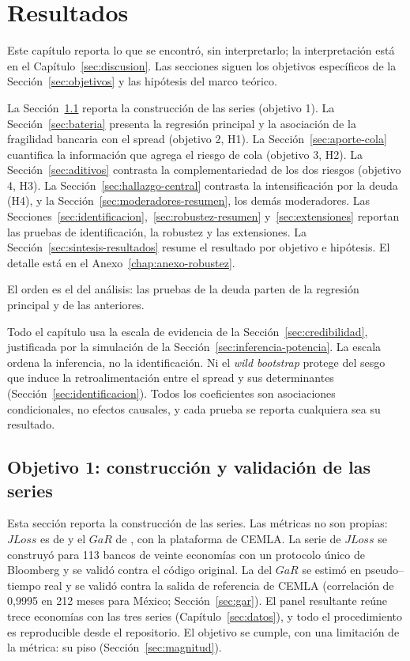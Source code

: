 \chapter{Resultados}
\label{sec:resultados}

Este capítulo reporta lo que se encontró, sin interpretarlo; la interpretación está en el Capítulo~\ref{sec:discusion}. Las secciones siguen los objetivos específicos de la Sección~\ref{sec:objetivos} y las hipótesis del marco teórico.

La Sección~\ref{sec:res-series} reporta la construcción de las series (objetivo 1). La Sección~\ref{sec:bateria} presenta la regresión principal y la asociación de la fragilidad bancaria con el spread (objetivo 2, H1). La Sección~\ref{sec:aporte-cola} cuantifica la información que agrega el riesgo de cola (objetivo 3, H2). La Sección~\ref{sec:aditivos} contrasta la complementariedad de los dos riesgos (objetivo 4, H3). La Sección~\ref{sec:hallazgo-central} contrasta la intensificación por la deuda (H4), y la Sección~\ref{sec:moderadores-resumen}, los demás moderadores. Las Secciones~\ref{sec:identificacion},~\ref{sec:robustez-resumen} y~\ref{sec:extensiones} reportan las pruebas de identificación, la robustez y las extensiones. La Sección~\ref{sec:sintesis-resultados} resume el resultado por objetivo e hipótesis. El detalle está en el Anexo~\ref{chap:anexo-robustez}.

El orden es el del análisis: las pruebas de la deuda parten de la regresión principal y de las anteriores.

Todo el capítulo usa la escala de evidencia de la Sección~\ref{sec:credibilidad}, justificada por la simulación de la Sección~\ref{sec:inferencia-potencia}. La escala ordena la inferencia, no la identificación. Ni el \textit{wild bootstrap} protege del sesgo que induce la retroalimentación entre el spread y sus determinantes (Sección~\ref{sec:identificacion}). Todos los coeficientes son asociaciones condicionales, no efectos causales, y cada prueba se reporta cualquiera sea su resultado.

\section{Objetivo 1: construcción y validación de las series}
\label{sec:res-series}

Esta sección reporta la construcción de las series. Las métricas no son propias: $JLoss$ es de \citet{Chari2024b} y el $GaR$ de \citet{ABG2019b}, con la plataforma de CEMLA. La serie de $JLoss$ se construyó para 113 bancos de veinte economías con un protocolo único de Bloomberg y se validó contra el código original. La del $GaR$ se estimó en pseudo--tiempo real y se validó contra la salida de referencia de CEMLA (correlación de 0,9995 en 212 meses para México; Sección~\ref{sec:gar}). El panel resultante reúne trece economías con las tres series (Capítulo~\ref{sec:datos}), y todo el procedimiento es reproducible desde el repositorio. El objetivo se cumple, con una limitación de la métrica: su piso (Sección~\ref{sec:magnitud}).

